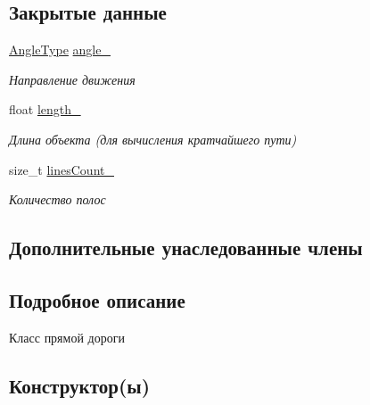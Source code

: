 \subsection*{Закрытые данные}
\begin{DoxyCompactItemize}
\item 
\mbox{\label{classrtm_1_1_driveway_object_ae1a5ce1c3e82307f34c1d31ad004b075}} 
\hyperlink{namespacertm_a69dc82b16a0148c10962caa83d930f89}{Angle\+Type} \hyperlink{classrtm_1_1_driveway_object_ae1a5ce1c3e82307f34c1d31ad004b075}{angle\+\_\+}
\begin{DoxyCompactList}\small\item\em Направление движения \end{DoxyCompactList}\item 
\mbox{\label{classrtm_1_1_driveway_object_a7338ac80dc7ac9e9a9f109c57fa1ff20}} 
float \hyperlink{classrtm_1_1_driveway_object_a7338ac80dc7ac9e9a9f109c57fa1ff20}{length\+\_\+}
\begin{DoxyCompactList}\small\item\em Длина объекта (для вычисления кратчайшего пути) \end{DoxyCompactList}\item 
\mbox{\label{classrtm_1_1_driveway_object_acb732900dd6a079b71038f3bb8732818}} 
size\+\_\+t \hyperlink{classrtm_1_1_driveway_object_acb732900dd6a079b71038f3bb8732818}{lines\+Count\+\_\+}
\begin{DoxyCompactList}\small\item\em Количество полос \end{DoxyCompactList}\end{DoxyCompactItemize}
\subsection*{Дополнительные унаследованные члены}


\subsection{Подробное описание}
Класс прямой дороги 

\subsection{Конструктор(ы)}
\mbox{\label{classrtm_1_1_driveway_object_aa9f5531382b6be2c6fb0cde4160a9f90}} 
